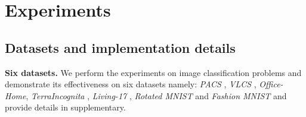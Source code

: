 \section{Experiments}


\subsection{Datasets and implementation details}

\vspace{1mm}
\noindent
\textbf{Six datasets.} 
We perform the experiments on image classification problems and demonstrate its effectiveness on six datasets namely: \textit{PACS} \cite{li2017deeper}, \textit{VLCS} \cite{fang2013video}, \textit{Office-Home}\cite{venkateswara2017deep}, \textit{TerraIncognita} \cite{beery2018recognition}, \textit{Living-17} \cite{santurkar2020breeds}, \textit{Rotated MNIST} and \textit{Fashion MNIST} \cite{piratla2020efficient} and provide details in supplementary. 




